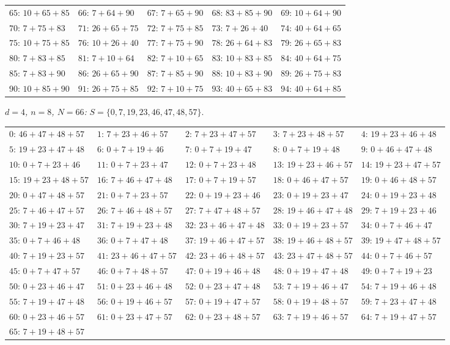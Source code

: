 \begin{center}
\begin{tabular}{lllll}
$65$: $10+65+85$ & $66$: $7+64+90$ & $67$: $7+65+90$ & $68$: $83+85+90$ & $69$: $10+64+90$\\
$70$: $7+75+83$ & $71$: $26+65+75$ & $72$: $7+75+85$ & $73$: $7+26+40$ & $74$: $40+64+65$\\
$75$: $10+75+85$ & $76$: $10+26+40$ & $77$: $7+75+90$ & $78$: $26+64+83$ & $79$: $26+65+83$\\
$80$: $7+83+85$ & $81$: $7+10+64$ & $82$: $7+10+65$ & $83$: $10+83+85$ & $84$: $40+64+75$\\
$85$: $7+83+90$ & $86$: $26+65+90$ & $87$: $7+85+90$ & $88$: $10+83+90$ & $89$: $26+75+83$\\
$90$: $10+85+90$ & $91$: $26+75+85$ & $92$: $7+10+75$ & $93$: $40+65+83$ & $94$: $40+64+85$
\end{tabular}
\end{center}

\emph{$d = 4$, $n = 8$, $N = 66$:} $S = \{0, 7, 19, 23, 46, 47, 48, 57\}$.
\begin{center}\scriptsize
\begin{tabular}{lllll}
$0$: $46+47+48+57$ & $1$: $7+23+46+57$ & $2$: $7+23+47+57$ & $3$: $7+23+48+57$ & $4$: $19+23+46+48$\\
$5$: $19+23+47+48$ & $6$: $0+7+19+46$ & $7$: $0+7+19+47$ & $8$: $0+7+19+48$ & $9$: $0+46+47+48$\\
$10$: $0+7+23+46$ & $11$: $0+7+23+47$ & $12$: $0+7+23+48$ & $13$: $19+23+46+57$ & $14$: $19+23+47+57$\\
$15$: $19+23+48+57$ & $16$: $7+46+47+48$ & $17$: $0+7+19+57$ & $18$: $0+46+47+57$ & $19$: $0+46+48+57$\\
$20$: $0+47+48+57$ & $21$: $0+7+23+57$ & $22$: $0+19+23+46$ & $23$: $0+19+23+47$ & $24$: $0+19+23+48$\\
$25$: $7+46+47+57$ & $26$: $7+46+48+57$ & $27$: $7+47+48+57$ & $28$: $19+46+47+48$ & $29$: $7+19+23+46$\\
$30$: $7+19+23+47$ & $31$: $7+19+23+48$ & $32$: $23+46+47+48$ & $33$: $0+19+23+57$ & $34$: $0+7+46+47$\\
$35$: $0+7+46+48$ & $36$: $0+7+47+48$ & $37$: $19+46+47+57$ & $38$: $19+46+48+57$ & $39$: $19+47+48+57$\\
$40$: $7+19+23+57$ & $41$: $23+46+47+57$ & $42$: $23+46+48+57$ & $43$: $23+47+48+57$ & $44$: $0+7+46+57$\\
$45$: $0+7+47+57$ & $46$: $0+7+48+57$ & $47$: $0+19+46+48$ & $48$: $0+19+47+48$ & $49$: $0+7+19+23$\\
$50$: $0+23+46+47$ & $51$: $0+23+46+48$ & $52$: $0+23+47+48$ & $53$: $7+19+46+47$ & $54$: $7+19+46+48$\\
$55$: $7+19+47+48$ & $56$: $0+19+46+57$ & $57$: $0+19+47+57$ & $58$: $0+19+48+57$ & $59$: $7+23+47+48$\\
$60$: $0+23+46+57$ & $61$: $0+23+47+57$ & $62$: $0+23+48+57$ & $63$: $7+19+46+57$ & $64$: $7+19+47+57$\\
$65$: $7+19+48+57$ &  &  &  & 
\end{tabular}
\end{center}

